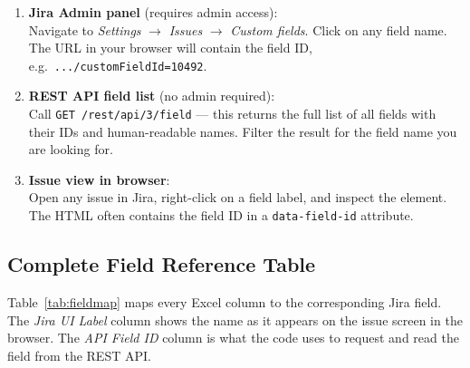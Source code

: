 \documentclass[12pt, a4paper]{article}
\begin{document}
\begin{enumerate}
    \item \textbf{Jira Admin panel} (requires admin access):\\
          Navigate to \textit{Settings} $\to$ \textit{Issues} $\to$ \textit{Custom fields}.
          Click on any field name. The URL in your browser will contain the field ID,
          e.g.\ \texttt{.../customFieldId=10492}.

    \item \textbf{REST API field list} (no admin required):\\
          Call \texttt{GET /rest/api/3/field} — this returns the full list of all fields
          with their IDs and human-readable names. Filter the result for the field name
          you are looking for.

    \item \textbf{Issue view in browser}:\\
          Open any issue in Jira, right-click on a field label, and inspect the element.
          The HTML often contains the field ID in a \texttt{data-field-id} attribute.
\end{enumerate}

\subsection{Complete Field Reference Table}

Table~\ref{tab:fieldmap} maps every Excel column to the corresponding Jira field. The
\textit{Jira UI Label} column shows the name as it appears on the issue screen in the
browser. The \textit{API Field ID} column is what the code uses to request and read the
field from the REST API.
\end{document}
